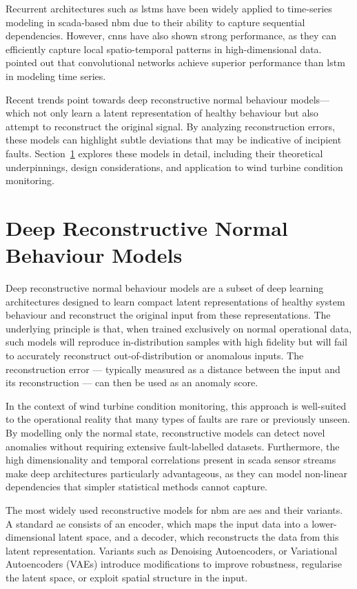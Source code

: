 Recurrent architectures such as \gls{lstm}s have been widely applied to time-series modeling in \gls{scada}-based \gls{nbm} due to their ability to capture sequential dependencies. 
However, \gls{cnn}s have also shown strong performance, as they can efficiently capture local spatio-temporal patterns in high-dimensional data. 
\cite{bai_empirical_2018} pointed out that convolutional networks achieve superior performance than \gls{lstm} in modeling time series.

Recent trends point towards deep reconstructive normal behaviour models—which not only learn a latent representation of healthy behaviour but also attempt to reconstruct the original signal.
By analyzing reconstruction errors, these models can highlight subtle deviations that may be indicative of incipient faults.
Section~\ref{sec:deep-reconstructive} explores these models in detail, including their theoretical underpinnings, design considerations, and application to wind turbine condition monitoring.



\section{Deep Reconstructive Normal Behaviour Models}
\label{sec:deep-reconstructive}
Deep reconstructive normal behaviour models are a subset of deep learning architectures designed to learn compact latent representations of healthy system behaviour and reconstruct the original input from these representations. 
The underlying principle is that, when trained exclusively on normal operational data, such models will reproduce in-distribution samples with high fidelity but will fail to accurately reconstruct out-of-distribution or anomalous inputs. 
The reconstruction error — typically measured as a distance between the input and its reconstruction — can then be used as an anomaly score.

In the context of wind turbine condition monitoring, this approach is well-suited to the operational reality that many types of faults are rare or previously unseen. 
By modelling only the normal state, reconstructive models can detect novel anomalies without requiring extensive fault-labelled datasets. 
Furthermore, the high dimensionality and temporal correlations present in \gls{scada} sensor streams make deep architectures particularly advantageous, as they can model non-linear dependencies that simpler statistical methods cannot capture.

The most widely used reconstructive models for \gls{nbm} are \glspl{ae} and their variants. 
A standard \gls{ae} consists of an encoder, which maps the input data into a lower-dimensional latent space, and a decoder, which reconstructs the data from this latent representation. 
Variants such as Denoising Autoencoders, or Variational Autoencoders (VAEs) introduce modifications to improve robustness, regularise the latent space, or exploit spatial structure in the input.

